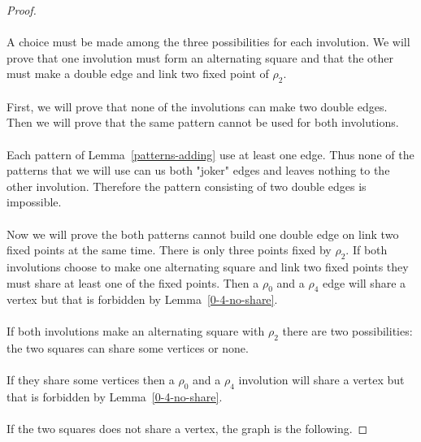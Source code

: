 \begin{proof}
\paragraph{}
A choice must be made among the three possibilities for each involution. We will prove that one involution must form an alternating square and that the other must make a double edge and link two fixed point of $\rho_2$.

\paragraph{}
First, we will prove that none of the involutions can make two double edges. Then we will prove that the same pattern cannot be used for both involutions.

\paragraph{}
Each pattern of Lemma~\ref{patterns-adding} use at least one edge. Thus none of the patterns that we will use can us both "joker" edges and leaves nothing to the other involution. Therefore the pattern consisting of two double edges is impossible.

\paragraph{}
Now we will prove the both patterns cannot build one double edge on link two fixed points at the same time. There is only three points fixed by $\rho_2$. If both involutions choose to make one alternating square and link two fixed points they must share at least one of the fixed points. Then a $\rho_0$ and a $\rho_4$ edge will share a vertex but that is forbidden by Lemma~\ref{0-4-no-share}.

\paragraph{}
If both involutions make an alternating square with $\rho_2$ there are two possibilities: the two squares can share some vertices or none.


\paragraph{}
If they share some vertices then a $\rho_0$ and a $\rho_4$ involution will share a vertex but that is forbidden by Lemma~\ref{0-4-no-share}.

\paragraph{}
If the two squares does not share a vertex, the graph is the following.


\end{proof}
